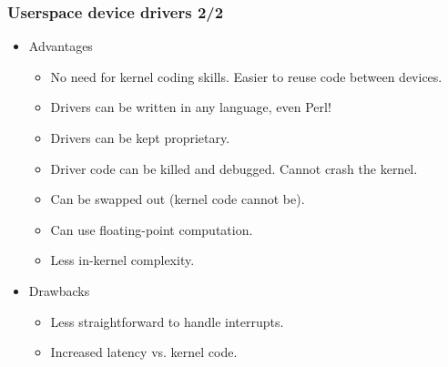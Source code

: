 \begin{frame}
  \frametitle{Userspace device drivers 2/2}
  \begin{itemize}
  \item Advantages
    \begin{itemize}
    \item No need for kernel coding skills. Easier to reuse code
      between devices.
    \item Drivers can be written in any language, even Perl!
    \item Drivers can be kept proprietary.
    \item Driver code can be killed and debugged. Cannot crash the
      kernel.
    \item Can be swapped out (kernel code cannot be).
    \item Can use floating-point computation.
    \item Less in-kernel complexity.
    \end{itemize}
  \item Drawbacks
    \begin{itemize}
    \item Less straightforward to handle interrupts.
    \item Increased latency vs. kernel code.
    \end{itemize}
  \end{itemize}
\end{frame}
